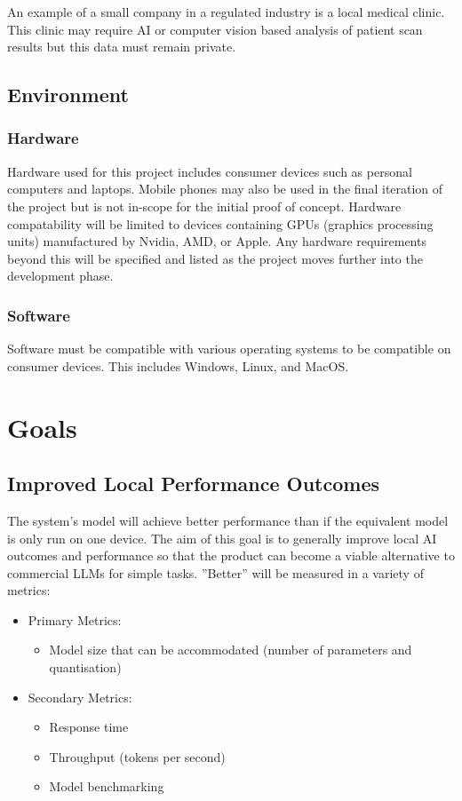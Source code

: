 \documentclass{article}
\begin{document}
An example of a small company in a regulated industry is a local medical clinic. This clinic may require AI or computer vision based analysis of patient scan results but this data must remain private.

\subsection{Environment}

\subsubsection{Hardware}

Hardware used for this project includes consumer devices such as personal computers and laptops. Mobile phones may also be used in the final iteration of the project but is not in-scope for the initial proof of concept.
Hardware compatability will be limited to devices containing GPUs (graphics processing units) manufactured by Nvidia, AMD, or Apple. Any hardware requirements beyond this will be specified and listed as the project moves further into the development phase.

\subsubsection{Software}

Software must be compatible with various operating systems to be compatible on consumer devices. This includes Windows, Linux, and MacOS.

\section{Goals}

\subsection{Improved Local Performance Outcomes}
The system's model will achieve better performance than if the equivalent model is only run on one
device. The aim of this goal is to generally improve local AI outcomes and performance so that the
product can become a viable alternative to commercial LLMs for simple tasks. ''Better'' will be
measured in a variety of metrics:
\begin{itemize}
	\item Primary Metrics:
		\begin{itemize}
			\item Model size that can be accommodated (number of parameters and quantisation)
		\end{itemize}
	\item Secondary Metrics:
		\begin{itemize}
			\item Response time
			\item Throughput (tokens per second)
			\item Model benchmarking
		\end{itemize}
\end{itemize}
\end{document}
